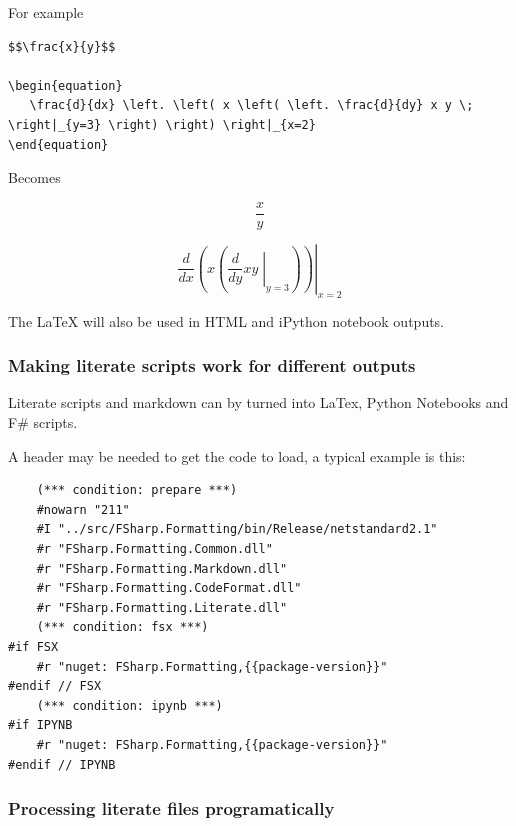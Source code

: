\documentclass{article}
\begin{document}
For example
\begin{lstlisting}
$$\frac{x}{y}$$

\begin{equation}
   \frac{d}{dx} \left. \left( x \left( \left. \frac{d}{dy} x y \; \right|_{y=3} \right) \right) \right|_{x=2}
\end{equation}

\end{lstlisting}


Becomes


\begin{equation}
\frac{x}{y}
\end{equation}




\begin{equation}
   \frac{d}{dx} \left. \left( x \left( \left. \frac{d}{dy} x y \; \right|_{y=3} \right) \right) \right|_{x=2}
\end{equation}




The LaTeX will also be used in HTML and iPython notebook outputs.
\subsubsection*{Making literate scripts work for different outputs}



Literate scripts and markdown can by turned into LaTex, Python Notebooks and F\# scripts.


A header may be needed to get the code to load, a typical example is this:
\begin{lstlisting}
    (*** condition: prepare ***)
    #nowarn "211"
    #I "../src/FSharp.Formatting/bin/Release/netstandard2.1"
    #r "FSharp.Formatting.Common.dll"
    #r "FSharp.Formatting.Markdown.dll"
    #r "FSharp.Formatting.CodeFormat.dll"
    #r "FSharp.Formatting.Literate.dll"
    (*** condition: fsx ***)
#if FSX
    #r "nuget: FSharp.Formatting,{{package-version}}"
#endif // FSX
    (*** condition: ipynb ***)
#if IPYNB
    #r "nuget: FSharp.Formatting,{{package-version}}"
#endif // IPYNB

\end{lstlisting}
\subsubsection*{Processing literate files programatically}
\end{document}
